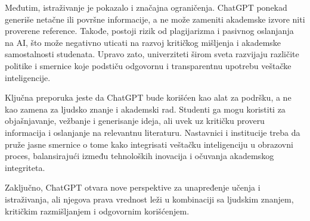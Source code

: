 \documentclass[12pt]{article}
\begin{document}
Međutim, istraživanje je pokazalo i značajna ograničenja. ChatGPT ponekad generiše netačne ili površne informacije, a ne može zameniti akademske izvore niti proverene reference. Takođe, postoji rizik od plagijarizma i pasivnog oslanjanja na AI, što može negativno uticati na razvoj kritičkog mišljenja i akademske samostalnosti studenata. Upravo zato, univerziteti širom sveta razvijaju različite politike i smernice koje podstiču odgovornu i transparentnu upotrebu veštačke inteligencije.

Ključna preporuka jeste da ChatGPT bude korišćen kao alat za podršku, a ne kao zamena za ljudsko znanje i akademski rad. Studenti ga mogu koristiti za objašnjavanje, vežbanje i generisanje ideja, ali uvek uz kritičku proveru informacija i oslanjanje na relevantnu literaturu. Nastavnici i institucije treba da pruže jasne smernice o tome kako integrisati veštačku inteligenciju u obrazovni proces, balansirajući između tehnoloških inovacija i očuvanja akademskog integriteta.

Zaključno, ChatGPT otvara nove perspektive za unapređenje učenja i istraživanja, ali njegova prava vrednost leži u kombinaciji sa ljudskim znanjem, kritičkim razmišljanjem i odgovornim korišćenjem. 

\newpage
\printbibliography
\end{document}
